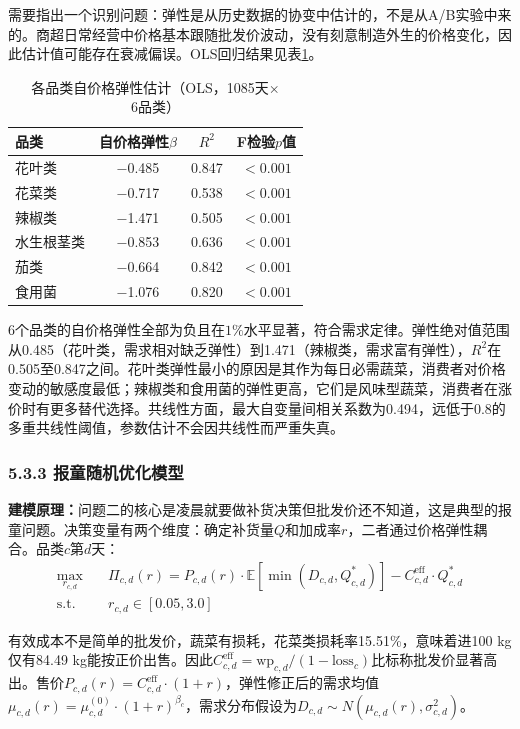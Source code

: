 \documentclass[12pt,a4paper]{article}
\begin{document}
需要指出一个识别问题：弹性是从历史数据的协变中估计的，不是从A/B实验中来的。商超日常经营中价格基本跟随批发价波动，没有刻意制造外生的价格变化，因此估计值可能存在衰减偏误。OLS回归结果见表\ref{tab:q2_elasticity}。

\begin{table}[H]
\centering
\caption{各品类自价格弹性估计（OLS，1085天$\times$6品类）}
\label{tab:q2_elasticity}
\begin{tabular}{lccc}
\toprule
品类 & 自价格弹性$\beta$ & $R^2$ & F检验$p$值 \\
\midrule
花叶类 & $-$0.485 & 0.847 & $<0.001$ \\
花菜类 & $-$0.717 & 0.538 & $<0.001$ \\
辣椒类 & $-$1.471 & 0.505 & $<0.001$ \\
水生根茎类 & $-$0.853 & 0.636 & $<0.001$ \\
茄类 & $-$0.664 & 0.842 & $<0.001$ \\
食用菌 & $-$1.076 & 0.820 & $<0.001$ \\
\bottomrule
\end{tabular}
\end{table}

6个品类的自价格弹性全部为负且在$1\%$水平显著，符合需求定律。弹性绝对值范围从0.485（花叶类，需求相对缺乏弹性）到1.471（辣椒类，需求富有弹性），$R^2$在0.505至0.847之间。花叶类弹性最小的原因是其作为每日必需蔬菜，消费者对价格变动的敏感度最低；辣椒类和食用菌的弹性更高，它们是风味型蔬菜，消费者在涨价时有更多替代选择。共线性方面，最大自变量间相关系数为0.494，远低于0.8的多重共线性阈值，参数估计不会因共线性而严重失真。

\subsubsection{5.3.3 报童随机优化模型}

\textbf{建模原理：}问题二的核心是凌晨就要做补货决策但批发价还不知道，这是典型的报童问题。决策变量有两个维度：确定补货量$Q$和加成率$r$，二者通过价格弹性耦合。品类$c$第$d$天：
\begin{align}
\max_{r_{c,d}} \quad & \Pi_{c,d}(r) = P_{c,d}(r) \cdot \mathbb{E}[\min(D_{c,d}, Q_{c,d}^*)] - C_{c,d}^{\text{eff}} \cdot Q_{c,d}^* \\
\text{s.t.} \quad & r_{c,d} \in [0.05, 3.0]
\end{align}

有效成本不是简单的批发价，蔬菜有损耗，花菜类损耗率15.51\%，意味着进100 kg仅有84.49 kg能按正价出售。因此$C_{c,d}^{\text{eff}} = \text{wp}_{c,d} / (1 - \text{loss}_c)$比标称批发价显著高出。售价$P_{c,d}(r) = C_{c,d}^{\text{eff}} \cdot (1 + r)$，弹性修正后的需求均值$\mu_{c,d}(r) = \mu_{c,d}^{(0)} \cdot (1 + r)^{\beta_c}$，需求分布假设为$D_{c,d} \sim N(\mu_{c,d}(r), \sigma_{c,d}^2)$。
\end{document}

